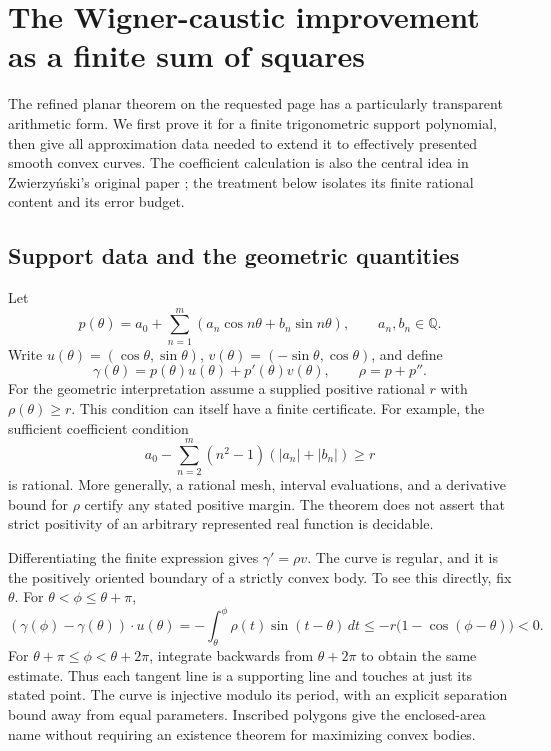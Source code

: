 \section{The Wigner-caustic improvement as a finite sum of squares}
\label{sec:wigner-new}
The refined planar theorem on the requested page has a particularly
transparent arithmetic form.  We first prove it for a finite
trigonometric support polynomial, then give all approximation data
needed to extend it to effectively presented smooth convex curves.
The coefficient calculation is also the central idea in
Zwierzy\'nski's original paper \cite{zwierzynski}; the treatment below isolates its
finite rational content and its error budget.

\subsection{Support data and the geometric quantities}
Let
\begin{equation}\label{eq:support-polynomial}
 p(\theta)=a_0+\sum_{n=1}^m
                 (a_n\cos n\theta+b_n\sin n\theta),
 \qquad a_n,b_n\in\mathbb Q.
\end{equation}
Write \(u(\theta)=(\cos\theta,\sin\theta)\),
\(v(\theta)=(-\sin\theta,\cos\theta)\), and define
\[
 \gamma(\theta)=p(\theta)u(\theta)+p'(\theta)v(\theta),
 \qquad \rho=p+p''.
\]
For the geometric interpretation assume a supplied positive rational
\(r\) with \(\rho(\theta)\ge r\).  This condition can itself have a
finite certificate.  For example, the sufficient coefficient
condition
\[
 a_0-\sum_{n=2}^m(n^2-1)(|a_n|+|b_n|)\ge r
\]
is rational.  More generally, a rational mesh, interval evaluations,
and a derivative bound for \(\rho\) certify any stated positive
margin.  The theorem does not assert that strict positivity of an
arbitrary represented real function is decidable.

Differentiating the finite expression gives \(\gamma'=\rho v\).
The curve is regular, and it is the positively oriented boundary
of a strictly convex body.  To see this directly, fix \(\theta\).
For \(\theta<\phi\le\theta+\pi\),
\[
 (\gamma(\phi)-\gamma(\theta))\mathbin{\cdot}u(\theta)
   =-\int_\theta^\phi\rho(t)\sin(t-\theta)\,dt
   \le-r\bigl(1-\cos(\phi-\theta)\bigr)<0.
\]
For \(\theta+\pi\le\phi<\theta+2\pi\), integrate backwards
from \(\theta+2\pi\) to obtain the same estimate.  Thus each
tangent line is a supporting line and touches at just its stated
point.  The curve is injective modulo its period, with an explicit
separation bound away from equal parameters.  Inscribed polygons
give the enclosed-area name without requiring an existence theorem
for maximizing convex bodies.

